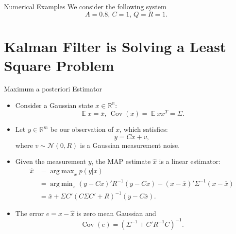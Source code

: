 \documentclass[10pt]{beamer}
\newlength\figureheight
\newlength\figurewidth
\newcommand{\tikzdir}[1]{#1.tikz}
\newcommand{\inputtikz}[1]{}}
\DeclareMathOperator{\1}{\textbf{1}}
\DeclareMathOperator{\Cov}{Cov}
\DeclareMathOperator{\argmin}{arg\;min}
\DeclareMathOperator{\argmax}{arg\;max}
\DeclareMathOperator{\E}{\mathbb E}
\begin{document}
\begin{frame}{Numerical Examples}
  We consider the following system
  \begin{displaymath}
    A = 0.8,\,C = 1,\, Q = R = 1. 
  \end{displaymath}
  \setlength\figureheight{5cm}
  \setlength\figurewidth{8cm}
  \begin{center}
    \inputtikz{eventbased}
  \end{center}
\end{frame}


\section{Kalman Filter is Solving a Least Square Problem}

\begin{frame}{Maximum a posteriori Estimator}
  \begin{itemize}
    \item Consider a Gaussian state $x\in \mathbb R^n$:
      \begin{displaymath}
	\E x = \bar x,\,\Cov(x) = \E xx^T = \Sigma.
      \end{displaymath}
    \item Let $y\in\mathbb R^m$ be our observation of $x$, which satisfies:
      \begin{displaymath}
	y = C x + v,
      \end{displaymath}
      where $v\sim \mathcal N(0,R)$ is a Gaussian measurement noise. 
    \item Given the measurement $y$, the MAP estimate $\hat x$ is a linear estimator:
      \begin{align*}
	\hat x &= \argmax_x {p(y|x)}\\
	       &= \argmin_x (y-Cx)'R^{-1}(y-Cx) + (x-\bar x)'\Sigma^{-1} (x-\bar x)\\
	&= \bar x + \Sigma C'(C\Sigma C'+R)^{-1}(y-C\bar x).
      \end{align*}
    \item The error $e = x - \hat x$ is zero mean Gaussian and
      \begin{displaymath}
	\Cov(e) = (\Sigma^{-1} +  C'  R^{-1}C)^{-1}.
      \end{displaymath}
  \end{itemize}
\end{frame}
\end{document}
